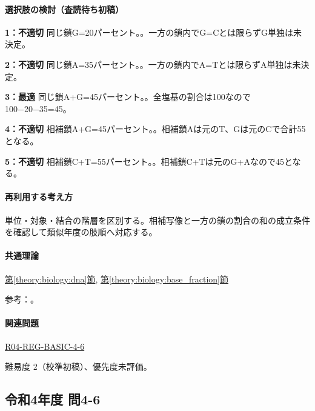 \paragraph{選択肢の検討（査読待ち初稿）}\mbox{}\par

\noindent\textbf{1：不適切} 同じ鎖G=\allowbreak{}20パーセント。。一方の鎖内でG=\allowbreak{}Cとは限らずG単独は未決定。\par

\noindent\textbf{2：不適切} 同じ鎖A=\allowbreak{}35パーセント。。一方の鎖内でA=\allowbreak{}Tとは限らずA単独は未決定。\par

\noindent\textbf{3：最適} 同じ鎖A+G=\allowbreak{}45パーセント。。全塩基の割合は100なので100−20−35=\allowbreak{}45。\par

\noindent\textbf{4：不適切} 相補鎖A+G=\allowbreak{}45パーセント。。相補鎖Aは元のT、Gは元のCで合計55となる。\par

\noindent\textbf{5：不適切} 相補鎖C+T=\allowbreak{}55パーセント。。相補鎖C+Tは元のG+Aなので45となる。\par

\paragraph{再利用する考え方} 単位・対象・結合の階層を区別する。相補写像と一方の鎖の割合の和の成立条件を確認して類似年度の肢順へ対応する。

\paragraph{共通理論} \hyperref[theory:biology:dna]{第\ref*{theory:biology:dna}節}, \hyperref[theory:biology:base_fraction]{第\ref*{theory:biology:base_fraction}節}

\par 参考：\cite{nhgri_dna}。

\paragraph{関連問題} \hyperref[q:r04-reg-basic-4-6]{R04-REG-BASIC-4-6}

\par 難易度 2（校準初稿）、優先度未評価。

\subsection{令和4年度 問4-6}
\label{q:r04-reg-basic-4-6}

